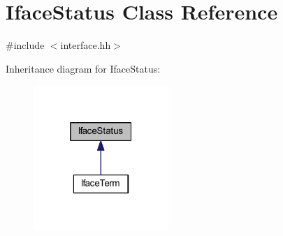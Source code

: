\hypertarget{class_iface_status}{}\section{Iface\+Status Class Reference}
\label{class_iface_status}


{\ttfamily \#include $<$interface.\+hh$>$}



Inheritance diagram for Iface\+Status\+:
\nopagebreak
\begin{figure}[H]
\begin{center}
\leavevmode
\includegraphics[width=145pt]{class_iface_status__inherit__graph}
\end{center}
\end{figure}
